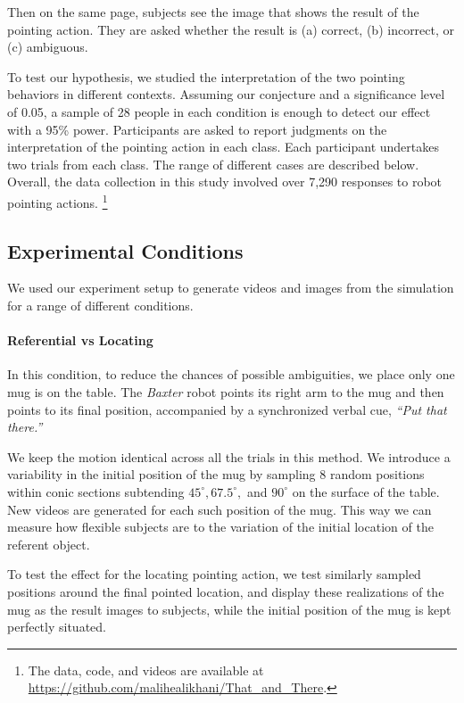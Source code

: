 \documentclass[letterpaper]{article} %
\begin{document}
Then on the same page, subjects see the image that shows the result of the pointing action. They are asked whether the result is (a) correct, (b) incorrect, or (c) ambiguous.  

To test our hypothesis, we studied the interpretation of the two pointing behaviors in different contexts. Assuming our conjecture and a significance level of 0.05, a sample of 28 people in each condition is enough to detect our effect with a 95\% power.  Participants are asked to report judgments on the interpretation of the pointing action in each class.  Each participant undertakes two trials from each class.  The range of different cases are described below.  Overall, the data collection in this study involved over 7,290 responses to robot pointing actions. \footnote{ The data, code, and videos are available at  \url{https://github.com/malihealikhani/That_and_There}.}

\subsection{Experimental Conditions}

We used our experiment setup to generate videos and images from the simulation for a range of different conditions.

\paragraph{Referential vs Locating}
In this condition, to reduce the chances of possible ambiguities, we place only one mug is on the table. The \textit{Baxter} robot points its right arm to the mug and then points to its final position, accompanied by a synchronized verbal cue, \textit{``Put that there.''}

We keep the motion identical across all the trials in this method. 
We introduce a variability in the initial position of the mug by sampling $8$ random positions within conic sections subtending $45^{\circ} , 67.5^{\circ}, $ and $90^{\circ}$ on the surface of the table. New videos are generated for each such position of the mug.
This way we can measure how flexible subjects are to the variation of the initial location of the referent object. 

To test the effect for the locating pointing action, we test similarly sampled positions around the final pointed location, and display these realizations of the mug as the result images to subjects, while the initial position of the mug is kept perfectly situated. 
\end{document}
